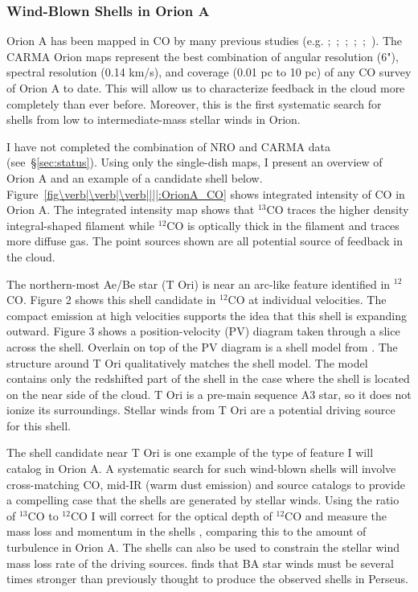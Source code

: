         \subsubsection{Wind-Blown Shells in Orion A}\label{sec:paper1}
Orion A has been mapped in CO by many previous studies (e.g. \citet{Bally87};~\citet{Wilson05};~\citet{Shimajiri11};~\citet{Buckle12};~\citet{Berne14};~\citet{Nishimura15}). The CARMA Orion maps represent the best combination of angular resolution (6"), spectral resolution (0.14 km/s), and coverage (0.01 pc to 10 pc) of any CO survey of Orion A to date. This will allow us to characterize feedback in the cloud more completely than ever before. Moreover, this is the first systematic search for shells from low to intermediate-mass stellar winds in Orion.
        
I have not completed the combination of NRO and CARMA data (see~\S\ref{sec:status}). Using only the single-dish maps, I present an overview of Orion A and an example of a candidate shell below. Figure~\ref{fig\verb|\verb|\verb||||:OrionA_CO} shows integrated intensity of CO in Orion A. The integrated intensity map shows that $^{13}$CO traces the higher density integral-shaped filament while $^{12}$CO is optically thick in the filament and traces more diffuse gas. The point sources shown are all potential source of feedback in the cloud.

The northern-most Ae/Be star (T Ori) is near an arc-like feature identified in $^{12}$CO. Figure 2 shows this shell candidate in $^{12}$CO at individual velocities. The compact emission at high velocities supports the idea that this shell is expanding outward. Figure 3 shows a position-velocity (PV) diagram taken through a slice across the shell. Overlain on top of the PV diagram is a shell model from \citet{Arce_2011}. The structure around T Ori qualitatively matches the shell model. The model contains only the redshifted part of the shell in the case where the shell is located on the near side of the cloud.  T Ori is a pre-main sequence A3 star, so it does not ionize its surroundings. Stellar winds from T Ori are a potential driving source for this shell.

The shell candidate near T Ori is one example of the type of feature I will catalog in Orion A. A systematic search for such wind-blown shells will involve cross-matching CO, mid-IR (warm dust emission) and source catalogs to provide a compelling case that the shells are generated by stellar winds. Using the ratio of $^{13}$CO to $^{12}$CO I will correct for the optical depth of $^{12}$CO and measure the mass loss and momentum in the shells \cite{Arce_2011}, comparing this to the amount of turbulence in Orion A. The shells can also be used to constrain the stellar wind mass loss rate of the driving sources. \citet{Offner15} finds that BA star winds must be several times stronger than previously thought to produce the observed shells in Perseus.
